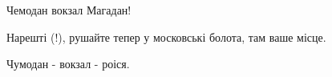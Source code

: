 \begin{itemize}
Чемодан вокзал Магадан!

 
Нарешті (!), рушайте тепер у московські болота, там ваше місце.

 
Чумодан - вокзал - роіся.

\end{itemize}

